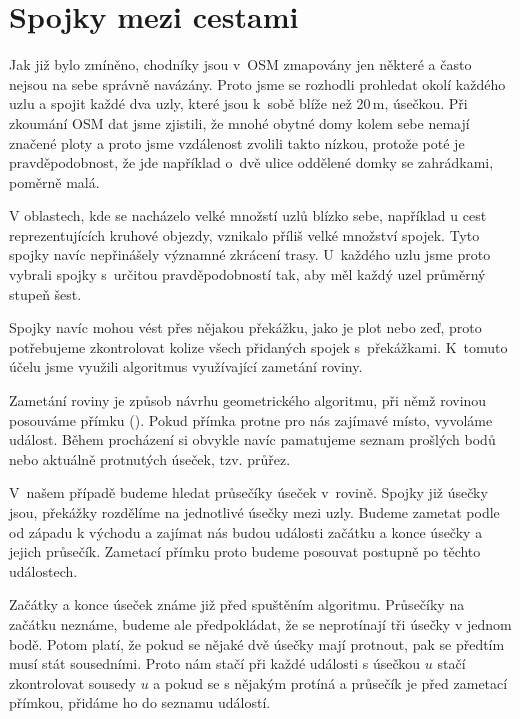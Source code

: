 \section{Spojky mezi cestami}
Jak již bylo zmíněno, chodníky jsou v~OSM zmapovány jen některé a často nejsou
na sebe správně navázány. Proto jsme se rozhodli prohledat okolí každého uzlu a
spojit každé dva uzly, které jsou k~sobě blíže než 20\,m, úsečkou. Při zkoumání
OSM dat jsme zjistili, že mnohé obytné domy kolem sebe nemají značené ploty a
proto jsme vzdálenost zvolili takto nízkou, protože poté je pravděpodobnost, že
jde například o~dvě ulice oddělené domky se zahrádkami, poměrně malá.  

V oblastech, kde se nacházelo velké množstí uzlů blízko sebe, například u cest
reprezentujících kruhové objezdy, vznikalo příliš velké množství spojek. Tyto
spojky navíc nepřinášely významné zkrácení trasy. U~každého uzlu jsme proto
vybrali spojky s~určitou pravděpodobností tak, aby měl každý uzel průměrný
stupeň šest.

Spojky navíc mohou vést přes nějakou překážku, jako je plot nebo zeď, proto
potřebujeme zkontrolovat kolize všech přidaných spojek s~překážkami. K~tomuto
účelu jsme využili algoritmus využívající zametání roviny.


{\tuc Zametání roviny}\cite{zametani} je způsob návrhu geometrického algoritmu,
při němž rovinou posouváme přímku (). Pokud přímka protne pro nás
zajímavé místo, vyvoláme událost. Během procházení si obvykle navíc pamatujeme
seznam prošlých bodů nebo aktuálně protnutých úseček, tzv. {\tuc průřez}.

V~našem případě budeme hledat průsečíky úseček v~rovině. Spojky již úsečky jsou,
překážky rozdělíme na jednotlivé úsečky mezi uzly. Budeme zametat podle od
západu k východu a zajímat nás budou události začátku a konce úsečky a jejich
průsečík. Zametací přímku proto budeme posouvat postupně po těchto událostech.

Začátky a konce úseček známe již před spuštěním algoritmu. Průsečíky na začátku
neznáme, budeme ale předpokládat, že se neprotínají tři úsečky v jednom bodě.
Potom platí, že pokud se nějaké dvě úsečky mají protnout, pak se předtím musí
stát sousedními. Proto nám stačí při každé události s úsečkou $u$ stačí
zkontrolovat sousedy $u$ a pokud se s nějakým protíná a průsečík je před
zametací přímkou, přidáme ho do seznamu událostí.

